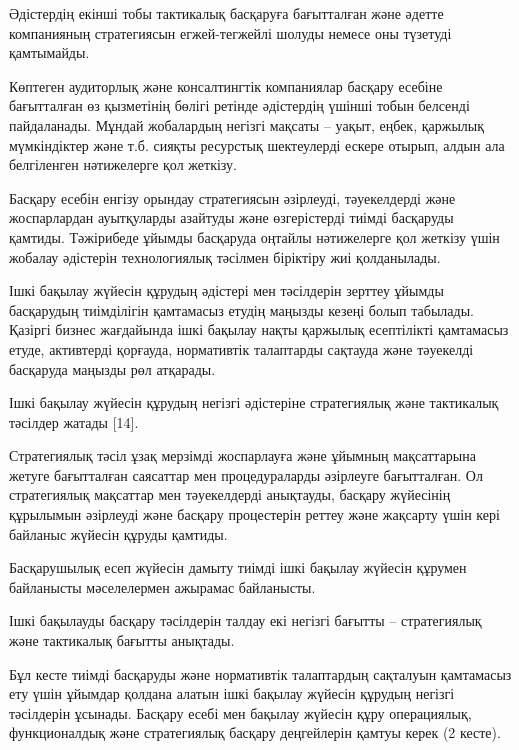 \begin{multicols}{2}
Әдістердің екінші тобы тактикалық басқаруға бағытталған және әдетте
компанияның стратегиясын егжей-тегжейлі шолуды немесе оны түзетуді
қамтымайды.

Көптеген аудиторлық және консалтингтік компаниялар басқару есебіне
бағытталған өз қызметінің бөлігі ретінде әдістердің үшінші тобын
белсенді пайдаланады. Мұндай жобалардың негізгі мақсаты -- уақыт, еңбек,
қаржылық мүмкіндіктер және т.б. сияқты ресурстық шектеулерді ескере
отырып, алдын ала белгіленген нәтижелерге қол жеткізу.

Басқару есебін енгізу орындау стратегиясын әзірлеуді, тәуекелдерді және
жоспарлардан ауытқуларды азайтуды және өзгерістерді тиімді басқаруды
қамтиды. Тәжірибеде ұйымды басқаруда оңтайлы нәтижелерге қол жеткізу
үшін жобалау әдістерін технологиялық тәсілмен біріктіру жиі қолданылады.

Ішкі бақылау жүйесін құрудың әдістері мен тәсілдерін зерттеу ұйымды
басқарудың тиімділігін қамтамасыз етудің маңызды кезеңі болып табылады.
Қазіргі бизнес жағдайында ішкі бақылау нақты қаржылық есептілікті
қамтамасыз етуде, активтерді қорғауда, нормативтік талаптарды сақтауда
және тәуекелді басқаруда маңызды рөл атқарады.

Ішкі бақылау жүйесін құрудың негізгі әдістеріне стратегиялық және
тактикалық тәсілдер жатады {[}14{]}.

Стратегиялық тәсіл ұзақ мерзімді жоспарлауға және ұйымның мақсаттарына
жетуге бағытталған саясаттар мен процедураларды әзірлеуге бағытталған.
Ол стратегиялық мақсаттар мен тәуекелдерді анықтауды, басқару жүйесінің
құрылымын әзірлеуді және басқару процестерін реттеу және жақсарту үшін
кері байланыс жүйесін құруды қамтиды.

Басқарушылық есеп жүйесін дамыту тиімді ішкі бақылау жүйесін құрумен
байланысты мәселелермен ажырамас байланысты.

Ішкі бақылауды басқару тәсілдерін талдау екі негізгі бағытты --
стратегиялық және тактикалық бағытты анықтады.

Бұл кесте тиімді басқаруды және нормативтік талаптардың сақталуын
қамтамасыз ету үшін ұйымдар қолдана алатын ішкі бақылау жүйесін құрудың
негізгі тәсілдерін ұсынады. Басқару есебі мен бақылау жүйесін құру
операциялық, функционалдық және стратегиялық басқару деңгейлерін қамтуы
керек (2 кесте).
\end{multicols}

